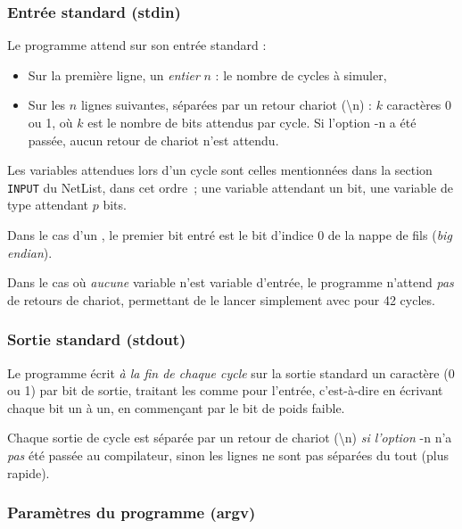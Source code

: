 \documentclass[11pt,a4paper]{article}
\begin{document}
\subsubsection*{Entrée standard (stdin)}

Le programme attend sur son entrée standard :

\begin{itemize}
\item Sur la première ligne, un \emph{entier} $n$ : le nombre de cycles à simuler,
\item Sur les $n$ lignes suivantes, séparées par un retour chariot (\textbackslash n) : $k$ caractères 0 ou 1, où $k$ est le nombre de bits attendus par cycle. Si l'option -n a été passée, aucun retour de chariot n'est attendu.
\end{itemize}

Les variables attendues lors d'un cycle sont celles mentionnées dans la section \lstinline`INPUT` du NetList, dans cet ordre~; une variable  attendant un bit, une variable de type  attendant $p$ bits.

Dans le cas d'un , le premier bit entré est le bit d'indice 0 de la nappe de fils (\emph{big endian}).

Dans le cas où \emph{aucune} variable n'est variable d'entrée, le programme n'attend \emph{pas} de retours de chariot, permettant de le lancer simplement avec  pour 42 cycles.

\subsubsection*{Sortie standard (stdout)}

Le programme écrit \emph{à la fin de chaque cycle} sur la sortie standard un caractère (0 ou 1) par bit de sortie, traitant les  comme pour l'entrée, c'est-à-dire en écrivant chaque bit un à un, en commençant par le bit de poids faible.

Chaque sortie de cycle est séparée par un retour de chariot (\textbackslash n) \emph{si l'option} -n n'a \emph{pas} été passée au compilateur, sinon les lignes ne sont pas séparées du tout (plus rapide).

\subsubsection*{Paramètres du programme (argv)}
\end{document}
